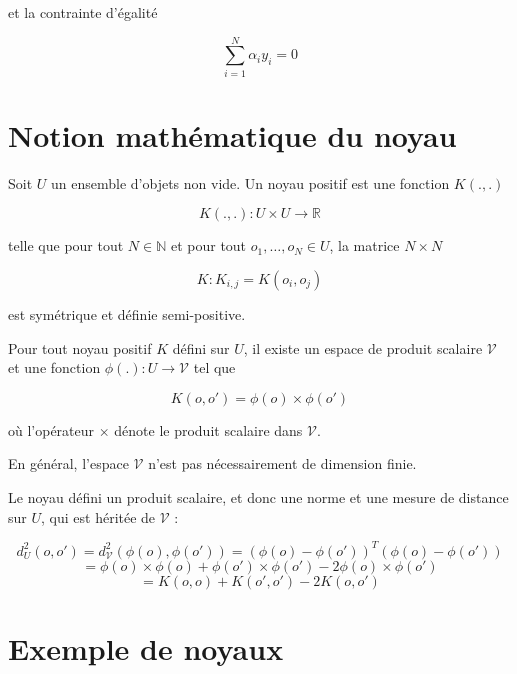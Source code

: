 et la contrainte d'égalité

$$\sum_{i = 1}^N \alpha_i y_i = 0$$

\section{Notion mathématique du noyau}

Soit $U$ un ensemble d'objets non vide. Un noyau positif est une fonction $K(., .)$

$$K(.,.) : U \times U \rightarrow \mathbb{R}$$

telle que pour tout $N \in \mathbb{N}$ et pour tout $o_1, \dots , o_N \in U$, la matrice $N \times N$

$$K : K_{i, j} = K(o_i, o_j)$$

est symétrique et définie semi-positive.

Pour tout noyau positif $K$ défini sur $U$, il existe un espace de produit scalaire $\mathcal{V}$ et une fonction $\phi(.) : U \rightarrow \mathcal{V}$ tel que

$$K(o, o') = \phi(o) \times \phi(o')$$

où l'opérateur $\times$ dénote le produit scalaire dans $\mathcal{V}$.

En général, l'espace $\mathcal{V}$ n'est pas nécessairement de dimension finie.

Le noyau défini un produit scalaire, et donc une norme et une mesure de distance sur $U$, qui est héritée de $\mathcal{V}$ :

$$d^2_U(o, o') = d^2_\mathcal{V}(\phi(o), \phi(o')) = (\phi(o) - \phi(o'))^T(\phi(o) - \phi(o'))$$
$$= \phi(o) \times \phi(o) + \phi(o') \times \phi(o') - 2 \phi(o) \times \phi(o')$$
$$= K(o, o) + K(o', o') - 2 K(o, o')$$

\section{Exemple de noyaux}

